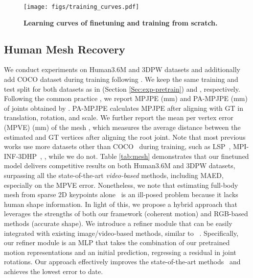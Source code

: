 \begin{figure*}[t]
  \centering
  \texttt{[image: figs/training\_curves.pdf]}
  \caption{\textbf{Learning curves of finetuning and training from scratch.}}
  \label{fig:training_curve}
\end{figure*}

\subsection{Human Mesh Recovery}
We conduct experiments on Human3.6M \cite{h36m_pami} and 3DPW \cite{vonMarcard2018} datasets and additionally add COCO \cite{lin2014microsoft} dataset during training following \cite{lin2021end, wan2021, kocabas2020vibe}. 
We keep the same training and test split for both datasets as in \cite{martinez_2017_3dbaseline} (Section \ref{Sec:exp-pretrain}) and \cite{kocabas2020vibe, wan2021, lin2021end}, respectively. Following the common practice \cite{kanazawa2018end, kolotouros2019convolutional, kocabas2020vibe, wan2021}, we report MPJPE (mm) and PA-MPJPE (mm) of  joints obtained by . PA-MPJPE calculates MPJPE after aligning with GT in translation, rotation, and scale. We further report the mean per vertex error (MPVE) (mm) of the mesh , which measures the average distance between the estimated and GT vertices after aligning the root joint. Note that most previous works \cite{kanazawa2018end, kolotouros2019learning, kocabas2020vibe, luo20203d, choi2021beyond, li2021hybrik, lin2021end, wan2021} use more datasets other than COCO~\cite{lin2014microsoft} during training, such as LSP~\cite{johnson2010clustered}, MPI-INF-3DHP~\cite{mehta2017monocular}, \etc, while we do not.
Table \ref{tab:mesh} demonstrates that our finetuned model delivers competitive results on both Human3.6M and 3DPW datasets, surpassing all the state-of-the-art \textit{video-based} methods, including MAED\cite{wan2021}, especially on the MPVE error. Nonetheless, we note that estimating full-body mesh from sparse 2D keypoints alone~\cite{bogo2016keep, choi2020pose2mesh} is an ill-posed problem because it lacks human shape information. In light of this, we propose a hybrid approach that leverages the strengths of both our framework (coherent motion) and RGB-based methods (accurate shape). We introduce a refiner module that can be easily integrated with existing image/video-based methods, similar to ~\cite{baradel2022posebert, zeng2022smoothnet}. Specifically, our refiner module is an MLP that takes the combination of our pretrained motion representations and an initial prediction, regressing a residual in joint rotations. Our approach effectively improves the state-of-the-art methods~\cite{kolotouros2019learning, wan2021, li2021hybrik} and achieves the lowest error to date.



















